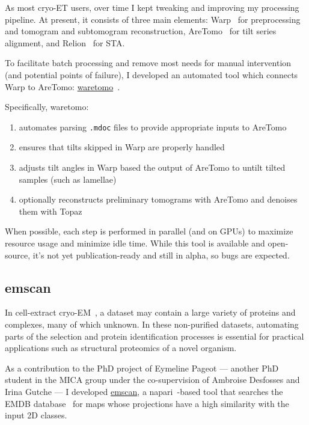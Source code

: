 As most cryo-ET users, over time I kept tweaking and improving my processing pipeline.
At present, it consists of three main elements: Warp~\cite{tegunovRealtimeCryoelectronMicroscopy2019} for preprocessing and tomogram and subtomogram reconstruction, AreTomo~\cite{zhengAreTomoIntegratedSoftware2022} for tilt series alignment, and Relion~\cite{scheresRELIONImplementationBayesian2012,zivanovBayesianApproachSingleparticle2022,burtImageProcessingPipeline2024} for STA.

To facilitate batch processing and remove most needs for manual intervention (and potential points of failure), I developed an automated tool which connects Warp to AreTomo: \href{https://gihub.com/brisvag/waretomo}{waretomo}~\cite{gaifasWaretomo2024}.

Specifically, waretomo:
\begin{enumerate}[noitemsep]
    \item automates parsing \texttt{.mdoc} files to provide appropriate inputs to AreTomo
    \item ensures that tilts skipped in Warp are properly handled
    \item adjusts tilt angles in Warp based the output of AreTomo to untilt tilted samples (such as lamellae)
    \item optionally reconstructs preliminary tomograms with AreTomo and denoises them with Topaz~\cite{beplerTopazDenoiseGeneralDeep2020}
\end{enumerate}

When possible, each step is performed in parallel (and on GPUs) to maximize resource usage and minimize idle time.
While this tool is available and open-source, it's not yet publication-ready and still in alpha, so bugs are expected.

\subsection{emscan}\label{emscan}

In cell-extract cryo-EM~\cite{suBuildRetrieveMethodology2021,kyrilisIntegrativeBiologyNative2019}, a dataset may contain a large variety of proteins and complexes, many of which unknown.
In these non-purified datasets, automating parts of the selection and protein identification processes is essential for practical applications such as structural proteomics of a novel organism.

As a contribution to the PhD project of Eymeline Pageot --- another PhD student in the MICA group under the co-supervision of Ambroise Desfosses and Irina Gutche --- I developed \href{https://gihub.com/brisvag/emscan}{emscan}, a napari~\cite{thenaparicommunityNapariMultidimensionalImage2024}-based tool that searches the EMDB database~\cite{thewwpdbconsortiumEMDBElectronMicroscopy2024} for maps whose projections have a high similarity with the input 2D classes.

